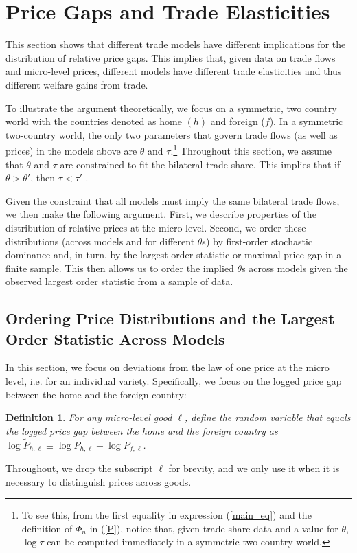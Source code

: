 \documentclass[12pt,dvips, ps2pdf]{article}
\newtheorem{df}{Definition}
\begin{document}
\section{Price Gaps and Trade Elasticities}\label{sec:two_country}

This section shows that different trade models have different implications for the distribution of relative price gaps. This implies that, given data on trade flows and micro-level prices, different models have different trade elasticities and thus different welfare gains from trade.

To illustrate the argument theoretically, we focus on a symmetric, two country world with the countries denoted as home $(h)$ and foreign ($f$). In a symmetric two-country world, the only two parameters that govern trade flows (as well as prices) in the models above are $\theta$ and $\tau$.\footnote{To see this, from the first equality in expression (\ref{main_eq}) and the definition of $\Phi_n$ in (\ref{P}), notice that, given trade share data and a value for $\theta$, $\log\tau$ can be computed immediately in a symmetric two-country world.} Throughout this section, we assume that $\theta$ and $\tau$ are constrained to fit the bilateral trade share. This implies that if $\theta > \theta'$, then $\tau < \tau'$ .

Given the constraint that all models must imply the same bilateral trade flows, we then make the following argument. First, we describe properties of the distribution of relative prices at the micro-level. Second, we order these distributions (across models and for different $\theta$s) by first-order stochastic dominance and, in turn, by the largest order statistic or maximal price gap in a finite sample. This then allows us to order the implied $\theta$s across models given the observed largest order statistic from a sample of data.

\subsection{Ordering Price Distributions and the Largest Order Statistic Across Models}

In this section, we focus on deviations from the law of one price at the micro level, i.e. for an individual variety. Specifically, we focus on the logged price gap between the home and the foreign country:
\begin{df}
For any micro-level good $\ell$, define the random variable that equals the logged price gap between the home and the foreign country as $\log \tilde P_{h,\ell}\equiv\log  P_{h,\ell}-\log  P_{f,\ell}$.
\end{df}
Throughout, we drop the subscript $\ell$ for brevity, and we only use it when it is necessary to distinguish prices across goods.
\end{document}
